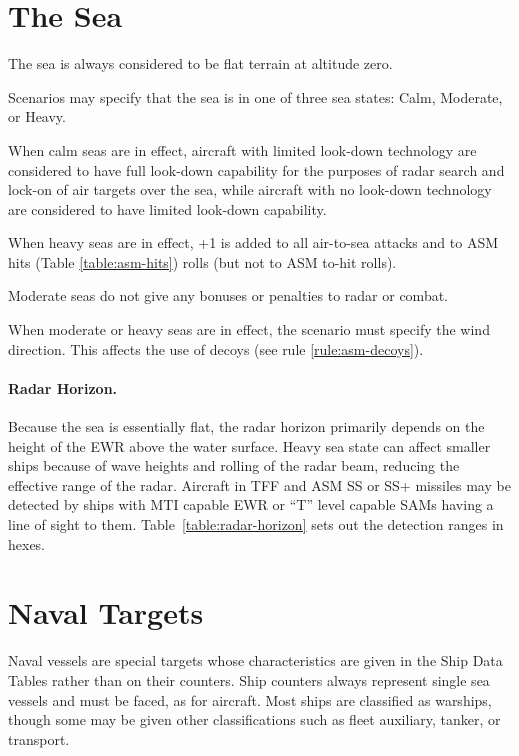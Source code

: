 

\label{rule:naval-units}

\section{The Sea}

The sea is always considered to be flat terrain at altitude zero. 

Scenarios may specify that the sea is in one of three sea states: Calm, Moderate, or Heavy.   

When calm seas are in effect, aircraft with limited look-down technology are considered to have full look-down capability for the purposes of radar search and lock-on of air targets over the sea, while aircraft with no look-down technology are considered to have limited look-down capability.  

When heavy seas are in effect, +1 is added to all air-to-sea attacks and to ASM hits (Table \ref{table:asm-hits}) rolls (but not to ASM to-hit rolls).  

Moderate seas do not give any bonuses or penalties to radar or combat.

When moderate or heavy seas are in effect, the scenario must specify the wind direction.  This affects the use of decoys (see rule \ref{rule:asm-decoys}).

\paragraph{Radar Horizon.} 

Because the sea is essentially flat, the radar horizon primarily depends on the height of the EWR above the water surface.  Heavy sea state can affect smaller ships because of wave heights and rolling of the radar beam, reducing the effective range of the radar.  Aircraft in TFF and ASM SS or SS+ missiles may be detected by ships with MTI capable EWR or “T” level capable SAMs having a line of sight to them. Table~\ref{table:radar-horizon} sets out the detection ranges in hexes.



\section{Naval Targets}

Naval vessels are special targets whose characteristics are given in the Ship Data Tables rather than on their counters.  Ship counters always represent single sea vessels and must be faced, as for aircraft.  Most ships are classified as warships, though some may be given other classifications such as fleet auxiliary, tanker, or transport.


